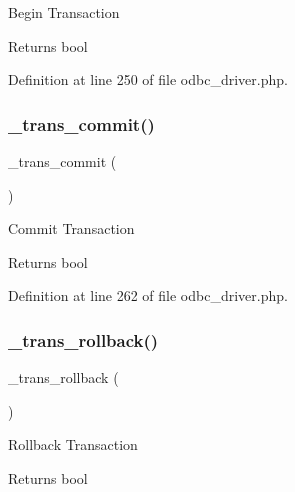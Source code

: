 Begin Transaction

\begin{DoxyReturn}{Returns}
bool 
\end{DoxyReturn}


Definition at line 250 of file odbc\+\_\+driver.\+php.

\mbox{\label{class_c_i___d_b__odbc__driver_a6fe7f373e0b11cfae23a5f41c0b35dda}} 
\subsubsection{\texorpdfstring{\_trans\_commit()}{\_trans\_commit()}}
{\footnotesize\ttfamily \+\_\+trans\+\_\+commit (\begin{DoxyParamCaption}{ }\end{DoxyParamCaption})\hspace{0.3cm}{\ttfamily [protected]}}

Commit Transaction

\begin{DoxyReturn}{Returns}
bool 
\end{DoxyReturn}


Definition at line 262 of file odbc\+\_\+driver.\+php.

\mbox{\label{class_c_i___d_b__odbc__driver_ad49a116b0776c26b53114c9093fd102a}} 
\subsubsection{\texorpdfstring{\_trans\_rollback()}{\_trans\_rollback()}}
{\footnotesize\ttfamily \+\_\+trans\+\_\+rollback (\begin{DoxyParamCaption}{ }\end{DoxyParamCaption})\hspace{0.3cm}{\ttfamily [protected]}}

Rollback Transaction

\begin{DoxyReturn}{Returns}
bool 
\end{DoxyReturn}


